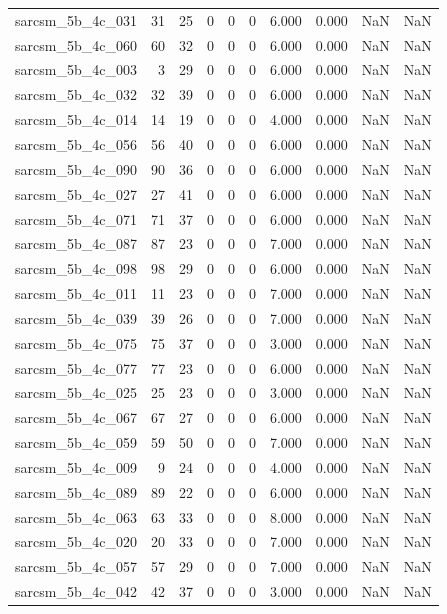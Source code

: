 \documentclass{article}
\begin{document}
\begin{longtable}{lrrrrrrrrr}
sarcsm\_5b\_4c\_031 & 31 & 25 & 0 & 0 & 0 & 6.000 & 0.000 & NaN & NaN \\
sarcsm\_5b\_4c\_060 & 60 & 32 & 0 & 0 & 0 & 6.000 & 0.000 & NaN & NaN \\
sarcsm\_5b\_4c\_003 & 3 & 29 & 0 & 0 & 0 & 6.000 & 0.000 & NaN & NaN \\
sarcsm\_5b\_4c\_032 & 32 & 39 & 0 & 0 & 0 & 6.000 & 0.000 & NaN & NaN \\
sarcsm\_5b\_4c\_014 & 14 & 19 & 0 & 0 & 0 & 4.000 & 0.000 & NaN & NaN \\
sarcsm\_5b\_4c\_056 & 56 & 40 & 0 & 0 & 0 & 6.000 & 0.000 & NaN & NaN \\
sarcsm\_5b\_4c\_090 & 90 & 36 & 0 & 0 & 0 & 6.000 & 0.000 & NaN & NaN \\
sarcsm\_5b\_4c\_027 & 27 & 41 & 0 & 0 & 0 & 6.000 & 0.000 & NaN & NaN \\
sarcsm\_5b\_4c\_071 & 71 & 37 & 0 & 0 & 0 & 6.000 & 0.000 & NaN & NaN \\
sarcsm\_5b\_4c\_087 & 87 & 23 & 0 & 0 & 0 & 7.000 & 0.000 & NaN & NaN \\
sarcsm\_5b\_4c\_098 & 98 & 29 & 0 & 0 & 0 & 6.000 & 0.000 & NaN & NaN \\
sarcsm\_5b\_4c\_011 & 11 & 23 & 0 & 0 & 0 & 7.000 & 0.000 & NaN & NaN \\
sarcsm\_5b\_4c\_039 & 39 & 26 & 0 & 0 & 0 & 7.000 & 0.000 & NaN & NaN \\
sarcsm\_5b\_4c\_075 & 75 & 37 & 0 & 0 & 0 & 3.000 & 0.000 & NaN & NaN \\
sarcsm\_5b\_4c\_077 & 77 & 23 & 0 & 0 & 0 & 6.000 & 0.000 & NaN & NaN \\
sarcsm\_5b\_4c\_025 & 25 & 23 & 0 & 0 & 0 & 3.000 & 0.000 & NaN & NaN \\
sarcsm\_5b\_4c\_067 & 67 & 27 & 0 & 0 & 0 & 6.000 & 0.000 & NaN & NaN \\
sarcsm\_5b\_4c\_059 & 59 & 50 & 0 & 0 & 0 & 7.000 & 0.000 & NaN & NaN \\
sarcsm\_5b\_4c\_009 & 9 & 24 & 0 & 0 & 0 & 4.000 & 0.000 & NaN & NaN \\
sarcsm\_5b\_4c\_089 & 89 & 22 & 0 & 0 & 0 & 6.000 & 0.000 & NaN & NaN \\
sarcsm\_5b\_4c\_063 & 63 & 33 & 0 & 0 & 0 & 8.000 & 0.000 & NaN & NaN \\
sarcsm\_5b\_4c\_020 & 20 & 33 & 0 & 0 & 0 & 7.000 & 0.000 & NaN & NaN \\
sarcsm\_5b\_4c\_057 & 57 & 29 & 0 & 0 & 0 & 7.000 & 0.000 & NaN & NaN \\
sarcsm\_5b\_4c\_042 & 42 & 37 & 0 & 0 & 0 & 3.000 & 0.000 & NaN & NaN \\

\end{longtable}
\end{document}

